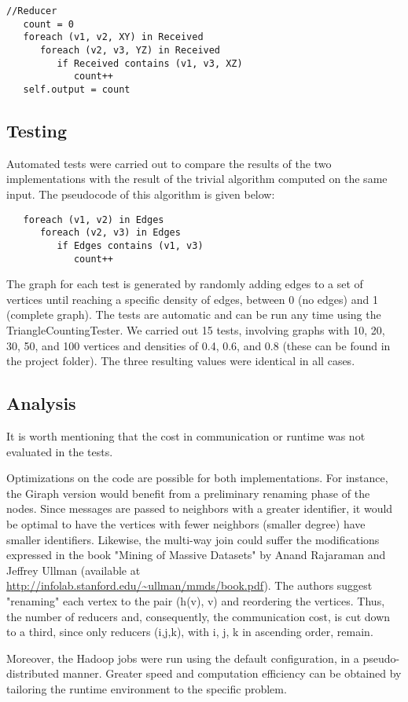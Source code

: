 \documentclass[Graph.tex]{subfiles}
\begin{document}
\begin{enumerate}[a]
{\begin{lstlisting}
//Reducer
   count = 0
   foreach (v1, v2, XY) in Received
      foreach (v2, v3, YZ) in Received
         if Received contains (v1, v3, XZ)
            count++
   self.output = count 
\end{lstlisting}

}

\end{enumerate}

\newpage

\subsection{Testing}

Automated tests were carried out to compare the results of the two implementations with the result of the trivial algorithm computed on the same input. The pseudocode of this algorithm is given below:

\begin{lstlisting}
   foreach (v1, v2) in Edges
      foreach (v2, v3) in Edges
         if Edges contains (v1, v3)
            count++
\end{lstlisting}

	The graph for each test is generated by randomly adding edges to a set of vertices until reaching a specific density of edges, between 0 (no edges) and 1 (complete graph). The tests are automatic and can be run any time using the TriangleCountingTester. We carried out 15 tests, involving graphs with 10, 20, 30, 50, and 100 vertices and densities of 0.4, 0.6, and 0.8 (these can be found in the project folder). The three resulting values were identical in all cases.
	
\subsection{Analysis}	

	It is worth mentioning that the cost in communication or runtime was not evaluated in the tests. 
	
	Optimizations on the code are possible for both implementations. For instance, the Giraph version would benefit from a preliminary renaming phase of the nodes. Since messages are passed to neighbors with a greater identifier, it would be optimal to have the vertices with fewer neighbors (smaller degree) have smaller identifiers. Likewise, the multi-way join could suffer the modifications expressed in the book "Mining of Massive Datasets" by Anand Rajaraman and Jeffrey Ullman (available at \url{http://infolab.stanford.edu/~ullman/mmds/book.pdf}). The authors suggest "renaming" each vertex to the pair (h(v), v) and reordering the vertices. Thus, the number of reducers and, consequently, the communication cost, is cut down to a third, since only reducers (i,j,k), with i, j, k in ascending order, remain.
	
	Moreover, the Hadoop jobs were run using the default configuration, in a pseudo-distributed manner. Greater speed and computation efficiency can be obtained by tailoring the runtime environment to the specific problem.
\end{document}

